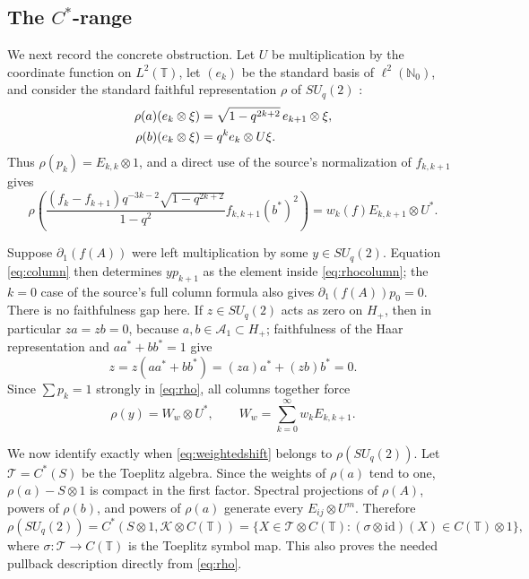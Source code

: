 \documentclass[11pt]{article}
\newcommand{\N}{\mathbb N}
\newcommand{\T}{\mathbb T}
\newcommand{\K}{\mathcal K}
\newcommand{\SU}{SU_q(2)}
\numberwithin{equation}{section}
\begin{document}
\subsection*{The $C^*$-range}

We next record the concrete obstruction.  Let $U$ be multiplication by the
coordinate function on $L^2(\T)$, let $(e_k)$ be the standard basis of
$\ell^2(\N_0)$, and consider the standard faithful representation
$\rho$ of $\SU$ \cite[Chapter 4]{KlimykSchmudgen}:
\begin{align}
 \rho(a)(e_k\otimes\xi)
   &=\sqrt{1-q^{2k+2}}\,e_{k+1}\otimes\xi,\notag\\
 \rho(b)(e_k\otimes\xi)&=q^k e_k\otimes U\xi.                 \label{eq:rho}
\end{align}
Thus $\rho(p_k)=E_{k,k}\otimes1$, and a direct use of the source's
normalization of $f_{k,k+1}$ gives
\begin{equation}
 \rho\!\left(
 \frac{(f_k-f_{k+1})q^{-3k-2}\sqrt{1-q^{2k+2}}}{1-q^2}
 f_{k,k+1}(b^*)^2\right)
 =w_k(f)E_{k,k+1}\otimes U^*.                                  \label{eq:rhocolumn}
\end{equation}

Suppose $\partial_1(f(A))$ were left multiplication by some $y\in\SU$.
Equation \eqref{eq:column} then determines $yp_{k+1}$ as the element inside
\eqref{eq:rhocolumn}; the $k=0$ case of the source's full column formula also
gives $\partial_1(f(A))p_0=0$.
There is no faithfulness gap here.  If $z\in\SU$ acts as zero on $H_+$,
then in particular $za=zb=0$, because $a,b\in\mathcal A_1\subset H_+$;
faithfulness of the Haar representation and $aa^*+bb^*=1$ give
\begin{equation}
 z=z(aa^*+bb^*)=(za)a^*+(zb)b^*=0.                              \label{eq:faithful}
\end{equation}
Since $\sum p_k=1$ strongly in \eqref{eq:rho}, all columns together force
\begin{equation}
 \rho(y)=W_w\otimes U^*,\qquad
 W_w=\sum_{k=0}^{\infty}w_k E_{k,k+1}.                          \label{eq:weightedshift}
\end{equation}

We now identify exactly when \eqref{eq:weightedshift} belongs to $\rho(\SU)$.  Let
$\mathcal T=C^*(S)$ be the Toeplitz algebra.  Since the weights of $\rho(a)$
tend to one, $\rho(a)-S\otimes1$ is compact in the first factor.  Spectral
projections of $\rho(A)$, powers of $\rho(b)$, and powers of $\rho(a)$
generate every $E_{ij}\otimes U^m$.  Therefore
\begin{equation}
 \rho(\SU)=C^*(S\otimes1,\K\otimes C(\T))
 =\{X\in\mathcal T\otimes C(\T):
       (\sigma\otimes\mathrm{id})(X)\in C(\T)\otimes1\},       \label{eq:pullback}
\end{equation}
where $\sigma:\mathcal T\to C(\T)$ is the Toeplitz symbol map.
This also proves the needed pullback description directly from \eqref{eq:rho}.
\end{document}
